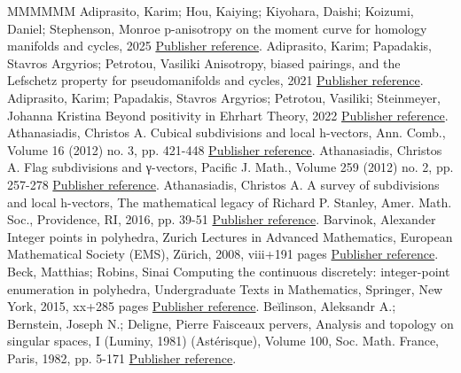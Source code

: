 \begin{thebibliography}{MMMMMM}
 Adiprasito, Karim; Hou, Kaiying; Kiyohara, Daishi; Koizumi, Daniel; Stephenson, Monroe p-anisotropy on the moment curve for homology manifolds and cycles, 2025 \href{https://alco.centre-mersenne.org/articles/10.5802/alco.453/#moment}{Publisher reference}.
 Adiprasito, Karim; Papadakis, Stavros Argyrios; Petrotou, Vasiliki Anisotropy, biased pairings, and the Lefschetz property for pseudomanifolds and cycles, 2021 \href{https://alco.centre-mersenne.org/articles/10.5802/alco.453/#APP}{Publisher reference}.
 Adiprasito, Karim; Papadakis, Stavros Argyrios; Petrotou, Vasiliki; Steinmeyer, Johanna Kristina Beyond positivity in Ehrhart Theory, 2022 \href{https://alco.centre-mersenne.org/articles/10.5802/alco.453/#APPS}{Publisher reference}.
 Athanasiadis, Christos A. Cubical subdivisions and local h-vectors, Ann. Comb., Volume 16 (2012) no. 3, pp. 421-448 \href{https://alco.centre-mersenne.org/articles/10.5802/alco.453/#Athanasiadis12b}{Publisher reference}.
 Athanasiadis, Christos A. Flag subdivisions and γ-vectors, Pacific J. Math., Volume 259 (2012) no. 2, pp. 257-278 \href{https://alco.centre-mersenne.org/articles/10.5802/alco.453/#AthanasiadisFlag}{Publisher reference}.
 Athanasiadis, Christos A. A survey of subdivisions and local h-vectors, The mathematical legacy of Richard P. Stanley, Amer. Math. Soc., Providence, RI, 2016, pp. 39-51 \href{https://alco.centre-mersenne.org/articles/10.5802/alco.453/#AthanasiadisSurvey}{Publisher reference}.
 Barvinok, Alexander Integer points in polyhedra, Zurich Lectures in Advanced Mathematics, European Mathematical Society (EMS), Zürich, 2008, viii+191 pages \href{https://alco.centre-mersenne.org/articles/10.5802/alco.453/#BarvinokIntegerPolyhedra}{Publisher reference}.
 Beck, Matthias; Robins, Sinai Computing the continuous discretely: integer-point enumeration in polyhedra, Undergraduate Texts in Mathematics, Springer, New York, 2015, xx+285 pages \href{https://alco.centre-mersenne.org/articles/10.5802/alco.453/#BeckRobinsComputing}{Publisher reference}.
 Beĭlinson, Aleksandr A.; Bernstein, Joseph N.; Deligne, Pierre Faisceaux pervers, Analysis and topology on singular spaces, I (Luminy, 1981) (Astérisque), Volume 100, Soc. Math. France, Paris, 1982, pp. 5-171 \href{https://alco.centre-mersenne.org/articles/10.5802/alco.453/#BBDG}{Publisher reference}.

\end{thebibliography}
